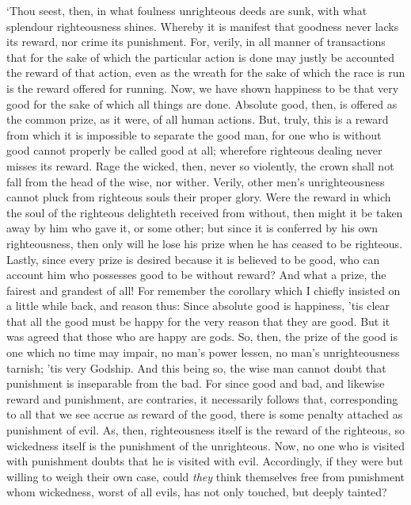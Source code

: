 \documentclass[11pt]{book}
\begin{document}
`Thou seest, then, in what foulness unrighteous deeds are sunk, with
what splendour righteousness shines. Whereby it is manifest that
goodness never lacks its reward, nor crime its punishment. For, verily,
in all manner of transactions that for the sake of which the particular
action is done may justly be accounted the reward of that action, even
as the wreath for the sake of which the race is run is the reward
offered for running. Now, we have shown happiness to be that very good
for the sake of which all things are done. Absolute good, then, is
offered as the common prize, as it were, of all human actions. But,
truly, this is a reward from which it is impossible to separate the good
man, for one who is without good cannot properly be called good at all;
wherefore righteous dealing never misses its reward. Rage the wicked,
then, never so violently, the crown shall not fall from the head of the
wise, nor wither. Verily, other men's unrighteousness cannot pluck from
righteous \linebreak souls their proper glory. Were the reward in which the soul of
the righteous delighteth received from without, then might it be taken
away by him who gave it, or some other; but since it is conferred by his
own righteousness, then only will he lose his prize when he has ceased
to be righteous. Lastly, since every prize is desired because it is
believed to be good, who can account him who possesses good to be
without reward? And what a prize, the fairest and grandest of all! For
remember the corollary which I chiefly insisted on a little while back,
and reason thus: Since absolute good is happiness, 'tis clear that all
the good must be happy for the very reason that they are good. But it
was agreed that those who are happy are gods. So, then, the prize of the
good is one which no time may impair, no man's power lessen, no man's
unrighteousness tarnish; 'tis very Godship. And this being so, the wise
man cannot doubt that punishment is inseparable from the bad. For since
good and bad, and likewise reward and punishment, are contraries, it
necessarily follows that, corresponding to all that we see accrue as
reward of the good, there is some penalty attached as punishment of
evil. As, then, righteousness itself is the reward of the righteous, so
wickedness itself is the punishment of the unrighteous. Now, no one who
is visited with punishment doubts that he is visited with evil.
Accordingly, if they were but willing to weigh their own case, could
\emph{they} think themselves free from punishment whom wickedness, worst of
all evils, has not only touched, but deeply tainted?
\end{document}
